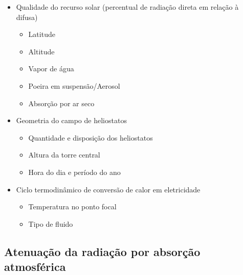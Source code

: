 \documentclass[12pt,notheorems,hyperref={pdfauthor= Rafael Nardi}]{beamer}
\begin{document}
\begin{frame}%
	\begin{itemize}
		\item Qualidade do recurso solar (percentual de radiação direta em relação à difusa)
			\begin{itemize}
				\item Latitude
				\item Altitude
				\item Vapor de água
				\item Poeira em suspensão/Aerosol
				\item Absorção por ar seco
			\end{itemize} \pause
			\bigskip
		\item Geometria do campo de heliostatos
			\begin{itemize}
				\item Quantidade e disposição dos heliostatos
				\item Altura da torre central
				\item Hora do dia e período do ano
			\end{itemize} \pause
			\bigskip
		\item Ciclo termodinâmico de conversão de calor em eletricidade
			\begin{itemize}
				\item Temperatura no ponto focal
				\item Tipo de fluido
			\end{itemize}
	\end{itemize}
\end{frame}

\subsection{Atenuação da radiação por absorção atmosférica}
\end{document}
